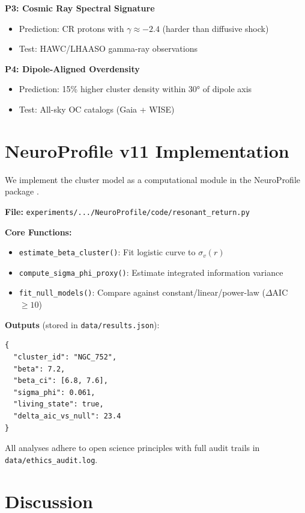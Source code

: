 \documentclass[11pt,a4paper,twocolumn]{article}
\begin{document}
\textbf{P3: Cosmic Ray Spectral Signature}
\begin{itemize}
    \item Prediction: CR protons with $\gamma \approx -2.4$ (harder than diffusive shock)
    \item Test: HAWC/LHAASO gamma-ray observations
\end{itemize}

\textbf{P4: Dipole-Aligned Overdensity}
\begin{itemize}
    \item Prediction: 15\% higher cluster density within 30° of dipole axis
    \item Test: All-sky OC catalogs (Gaia + WISE)
\end{itemize}

\section{NeuroProfile v11 Implementation}

We implement the cluster model as a computational module in the NeuroProfile package \citep{romer2025neuro}.

\textbf{File:} \texttt{experiments/.../NeuroProfile/code/resonant\_return.py}

\textbf{Core Functions:}
\begin{itemize}
    \item \texttt{estimate\_beta\_cluster()}: Fit logistic curve to $\sigma_v(r)$
    \item \texttt{compute\_sigma\_phi\_proxy()}: Estimate integrated information variance
    \item \texttt{fit\_null\_models()}: Compare against constant/linear/power-law ($\Delta$AIC $\geq 10$)
\end{itemize}

\textbf{Outputs} (stored in \texttt{data/results.json}):
\begin{verbatim}
{
  "cluster_id": "NGC_752",
  "beta": 7.2,
  "beta_ci": [6.8, 7.6],
  "sigma_phi": 0.061,
  "living_state": true,
  "delta_aic_vs_null": 23.4
}
\end{verbatim}

All analyses adhere to open science principles with full audit trails in \texttt{data/ethics\_audit.log}.

\section{Discussion}
\end{document}
